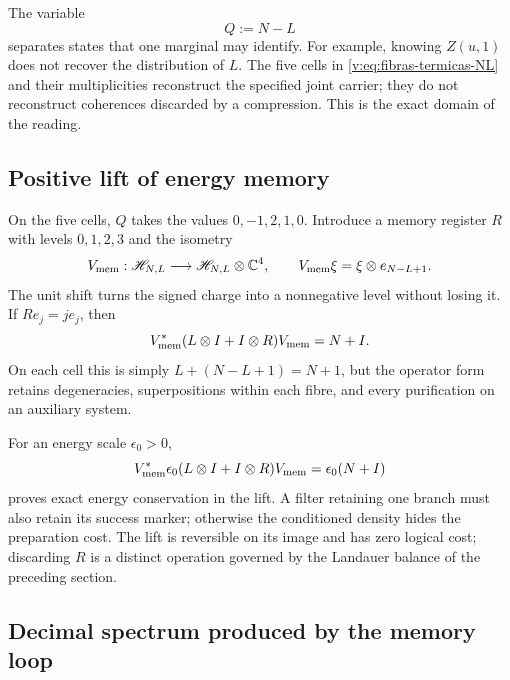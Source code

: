 The variable
\begin{equation}
 Q:=N-L
 \label{v:eq:carga-memoria-Q}
\end{equation}
separates states that one marginal may identify. For example, knowing
$Z(u,1)$ does not recover the distribution of $L$. The five cells in
\eqref{v:eq:fibras-termicas-NL} and their multiplicities reconstruct the
specified joint carrier; they do not reconstruct coherences discarded by a
compression. This is the exact domain of the reading.

\subsection{Positive lift of energy memory}

On the five cells, $Q$ takes the values $0,-1,2,1,0$. Introduce a memory
register $R$ with levels $0,1,2,3$ and the isometry
\begin{equation}
 V_{\rm mem}:\mathscr H_{N,L}\longrightarrow
 \mathscr H_{N,L}\otimes\mathbb C^4,\qquad
 V_{\rm mem}\xi=\xi\otimes e_{N-L+1}.
 \label{v:eq:isometria-memoria-positiva}
\end{equation}
The unit shift turns the signed charge into a nonnegative level without
losing it. If $R e_j=j e_j$, then
\begin{equation}
 V_{\rm mem}^*(L\otimes I+I\otimes R)V_{\rm mem}=N+I.
 \label{v:eq:balance-positivo-memoria}
\end{equation}
On each cell this is simply $L+(N-L+1)=N+1$, but the operator form retains
degeneracies, superpositions within each fibre, and every purification on an
auxiliary system.

For an energy scale $\epsilon_0>0$,
\begin{equation}
 V_{\rm mem}^*\epsilon_0(L\otimes I+I\otimes R)V_{\rm mem}
 =\epsilon_0(N+I)
 \label{v:eq:energia-lift-memoria}
\end{equation}
proves exact energy conservation in the lift. A filter retaining one branch
must also retain its success marker; otherwise the conditioned density hides
the preparation cost. The lift is reversible on its image and has zero
logical cost; discarding $R$ is a distinct operation governed by the Landauer
balance of the preceding section.

\subsection{Decimal spectrum produced by the memory loop}

